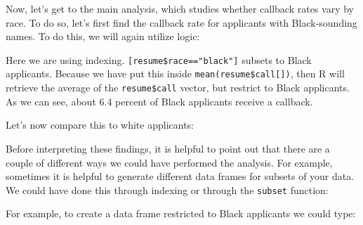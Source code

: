 \documentclass[
]{book}
\newenvironment{Shaded}{\begin{snugshade}}{\end{snugshade}}
\newcommand{\DecValTok}[1]{\textcolor[rgb]{0.00,0.00,0.81}{#1}}
\newcommand{\FloatTok}[1]{\textcolor[rgb]{0.00,0.00,0.81}{#1}}
\newcommand{\FunctionTok}[1]{\textcolor[rgb]{0.13,0.29,0.53}{\textbf{#1}}}
\newcommand{\NormalTok}[1]{#1}
\newcommand{\OtherTok}[1]{\textcolor[rgb]{0.56,0.35,0.01}{#1}}
\newcommand{\SpecialCharTok}[1]{\textcolor[rgb]{0.81,0.36,0.00}{\textbf{#1}}}
\newcommand{\StringTok}[1]{\textcolor[rgb]{0.31,0.60,0.02}{#1}}
\begin{document}
Now, let's get to the main analysis, which studies whether callback rates vary by race. To do so, let's first find the callback rate for applicants with Black-sounding names. To do this, we will again utilize logic:

\begin{Shaded}
\end{Shaded}

Here we are using indexing. \texttt{{[}resume\$race=="black"{]}} subsets to Black applicants. Because we have put this inside \texttt{mean(resume\$call{[}{]})}, then R will retrieve the average of the \texttt{resume\$call} vector, but restrict to Black applicants. As we can see, about 6.4 percent of Black applicants receive a callback.

Let's now compare this to white applicants:

\begin{Shaded}
\end{Shaded}

Before interpreting these findings, it is helpful to point out that there are a couple of different ways we could have performed the analysis. For example, sometimes it is helpful to generate different data frames for subsets of your data. We could have done this through indexing or through the \texttt{subset} function:

For example, to create a data frame restricted to Black applicants we could type:

\begin{Shaded}
\end{Shaded}
\end{document}
